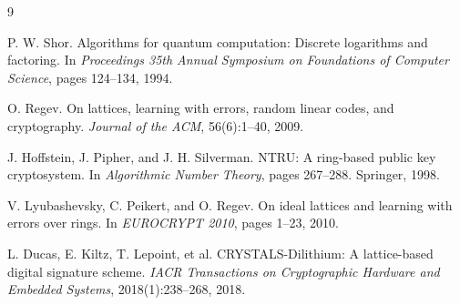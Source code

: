 \documentclass[11pt,a4paper]{article}
\begin{document}

\begin{thebibliography}{9}

P. W. Shor.
\newblock Algorithms for quantum computation: Discrete logarithms and factoring.
\newblock In \textit{Proceedings 35th Annual Symposium on Foundations of Computer Science}, pages 124--134, 1994.

O. Regev.
\newblock On lattices, learning with errors, random linear codes, and cryptography.
\newblock \textit{Journal of the ACM}, 56(6):1--40, 2009.

J. Hoffstein, J. Pipher, and J. H. Silverman.
\newblock NTRU: A ring-based public key cryptosystem.
\newblock In \textit{Algorithmic Number Theory}, pages 267--288. Springer, 1998.

V. Lyubashevsky, C. Peikert, and O. Regev.
\newblock On ideal lattices and learning with errors over rings.
\newblock In \textit{EUROCRYPT 2010}, pages 1--23, 2010.

L. Ducas, E. Kiltz, T. Lepoint, et al.
\newblock CRYSTALS-Dilithium: A lattice-based digital signature scheme.
\newblock \textit{IACR Transactions on Cryptographic Hardware and Embedded Systems}, 2018(1):238--268, 2018.

\end{thebibliography}
\end{document}
